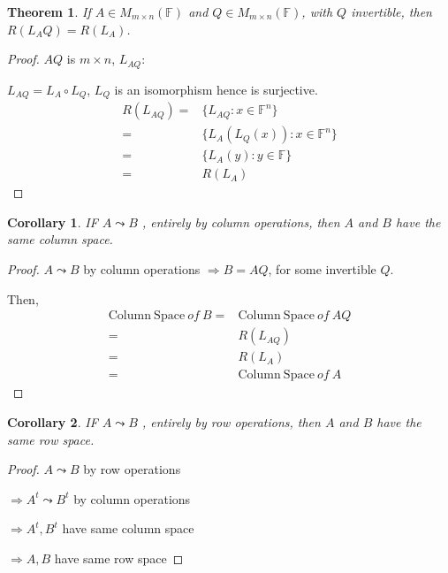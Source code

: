 \documentclass[12pt]{article}
\theoremstyle{plain}
\newtheorem{theorem}{Theorem}[subsection]
\newtheorem{corollary}{Corollary}[subsection]
\newcommand{\ColSpace}{\mathrm{Column \ Space}}
\newcommand{\mF}{{\mathbb{F}}}
\begin{document}
\begin{theorem}
	If $A \in M_{m\times n} (\mF)$ and $Q \in M_{m\times n}(\mF)$, with $Q$
	invertible, then $R(L_AQ) = R(L_A)$. 
\end{theorem}
\begin{proof}
	$AQ$ is $m\times n$, $L_{AQ}:$

	$L_{AQ} = L_A\circ L_Q$, $L_Q$ is an isomorphism hence is surjective. 
	\begin{align*}
		R(L_{AQ}) =& \{L_{AQ}: x\in \mF^n\} \\
		=& \{L_A(L_Q(x)): x\in \mF^n\} \\
		=& \{L_A(y): y\in\mF\} \tag{as $L_Q$ is surjective} \\
		=& R(L_A) 
	 \end{align*}
\end{proof}

\begin{corollary}
	IF $A \leadsto B$ , entirely by column operations, then $A$ and $B$ have 
	the same column space.
\end{corollary}
\begin{proof}
	$A \leadsto B$ by column operations $\Rightarrow B = AQ$, for some 
	invertible $Q$.
	
	Then, 
	\begin{align*}
		\ColSpace \ of \ B 
		=& \ColSpace \ of \ AQ		\\
		=& R(L_{AQ})	\\
		=& R(L_A) \tag{Thm 1}	\\
		=& \ColSpace \ of \ A
	\end{align*}
\end{proof}

\begin{corollary}
	IF $A \leadsto B$ , entirely by row operations, then $A$ and $B$ have 
	the same row space.
\end{corollary}
\begin{proof}
	$A \leadsto B$ by row operations

	$\Rightarrow A^t \leadsto B^t$ by column operations

	$\Rightarrow A^t, B^t$ have same column space

	$\Rightarrow A, B$ have same row space
\end{proof}
\end{document}
